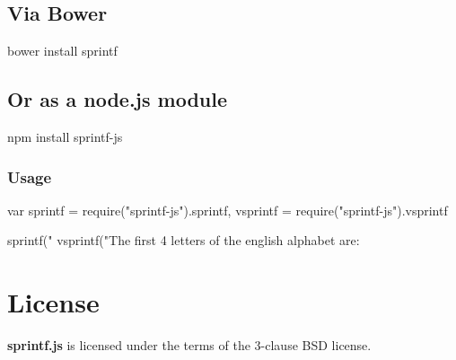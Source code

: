 \subsection*{Via Bower}

\begin{DoxyVerb}bower install sprintf
\end{DoxyVerb}


\subsection*{Or as a node.\+js module}

\begin{DoxyVerb}npm install sprintf-js
\end{DoxyVerb}


\subsubsection*{Usage}

\begin{DoxyVerb}var sprintf = require("sprintf-js").sprintf,
    vsprintf = require("sprintf-js").vsprintf

sprintf("%
vsprintf("The first 4 letters of the english alphabet are: %
\end{DoxyVerb}


\section*{License}

{\bfseries sprintf.\+js} is licensed under the terms of the 3-\/clause B\+SD license. 